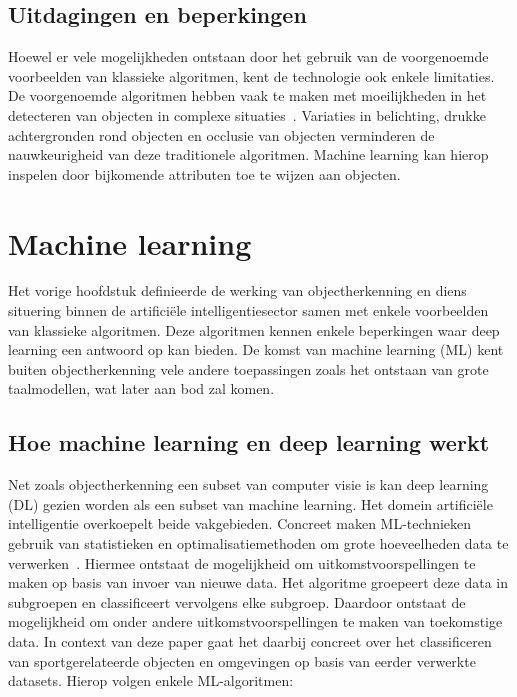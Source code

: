 \subsection{Uitdagingen en beperkingen}
\label{subsec:uitdagingen-en-beperkingen}
Hoewel er vele mogelijkheden ontstaan door het gebruik van de voorgenoemde voorbeelden van klassieke algoritmen, kent de technologie ook enkele limitaties.
De voorgenoemde algoritmen hebben vaak te maken met moeilijkheden in het detecteren van objecten in complexe situaties~\autocite{Luz2024}.
Variaties in belichting, drukke achtergronden rond objecten en occlusie van objecten verminderen de nauwkeurigheid van deze traditionele algoritmen.
Machine learning kan hierop inspelen door bijkomende attributen toe te wijzen aan objecten.

\section{Machine learning}\label{sec:datasets}
Het vorige hoofdstuk definieerde de werking van objectherkenning en diens situering binnen de artifici\"ele intelligentiesector samen met enkele voorbeelden van klassieke algoritmen.
Deze algoritmen kennen enkele beperkingen waar deep learning een antwoord op kan bieden.
De komst van machine learning (ML) kent buiten objectherkenning vele andere toepassingen zoals het ontstaan van grote taalmodellen, wat later aan bod zal komen.

\subsection{Hoe machine learning en deep learning werkt}
\label{subsec:hoe-deep-learning-werkt}
Net zoals objectherkenning een subset van computer visie is kan deep learning (DL) gezien worden als een subset van machine learning.
Het domein artifici\"ele intelligentie overkoepelt beide vakgebieden.
Concreet maken ML-technieken gebruik van statistieken en optimalisatiemethoden om grote hoeveelheden data te verwerken~\autocite{Pennone2024}.
Hiermee ontstaat de mogelijkheid om uitkomstvoorspellingen te maken op basis van invoer van nieuwe data.
Het algoritme groepeert deze data in subgroepen en classificeert vervolgens elke subgroep.
Daardoor ontstaat de mogelijkheid om onder andere uitkomstvoorspellingen te maken van toekomstige data.
In context van deze paper gaat het daarbij concreet over het classificeren van sportgerelateerde objecten en omgevingen op basis van eerder verwerkte datasets.
Hierop volgen enkele ML-algoritmen:

